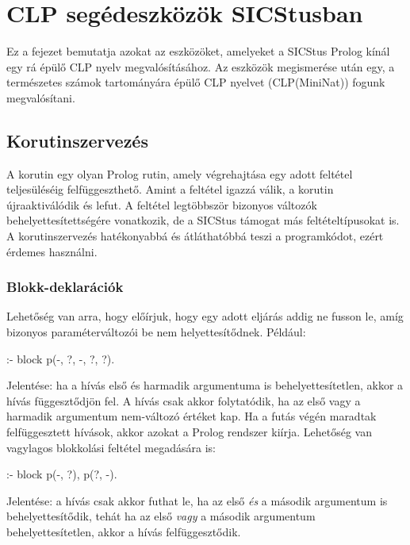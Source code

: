 \clearpage

\chapter{CLP segédeszközök SICStusban}

Ez a fejezet bemutatja azokat az eszközöket, amelyeket a SICStus Prolog
kínál egy rá épülő CLP nyelv megvalósításához. Az eszközök megismerése után
egy, a természetes számok tartományára épülő CLP nyelvet (CLP(MiniNat))
fogunk megvalósítani.

\section{Korutinszervezés}

A korutin egy olyan Prolog rutin, amely végrehajtása egy adott feltétel
teljesüléséig felfüggeszthető. Amint a feltétel igazzá válik, a korutin
újraaktiválódik és lefut. A feltétel legtöbbször bizonyos változók
behelyettesítettségére vonatkozik, de a SICStus támogat más feltételtípusokat
is. A korutinszervezés hatékonyabbá és átláthatóbbá teszi a programkódot,
ezért érdemes használni.

\subsection{Blokk-deklarációk}

Lehetőség van arra, hogy előírjuk, hogy egy adott eljárás addig ne fusson
le, amíg bizonyos paraméterváltozói be nem helyettesítődnek. Például:

\begin{prologcode}
:- block p(-, ?, -, ?, ?).
\end{prologcode}

Jelentése: ha a  hívás első és harmadik argumentuma is
behelyettesítetlen, akkor a hívás függesztődjön fel. A hívás csak akkor
folytatódik, ha az első vagy a harmadik argumentum nem-változó értéket
kap. Ha a futás végén maradtak felfüggesztett hívások, akkor azokat a Prolog
rendszer kiírja. Lehetőség van vagylagos blokkolási feltétel megadására is:

\begin{prologcode}
:- block p(-, ?), p(?, -).
\end{prologcode}

Jelentése: a  hívás csak akkor futhat le, ha az első \emph{és} a
második argumentum is behelyettesítődik, tehát ha az első \emph{vagy} a
második argumentum behelyettesítetlen, akkor a hívás felfüggesztődik.


